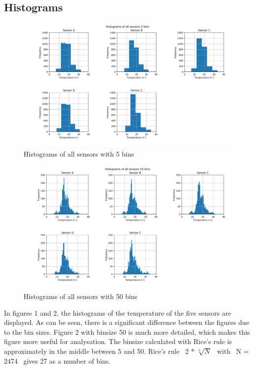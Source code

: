 \documentclass{article}
\begin{document}
    \subsection{Histograms}
        \begin{figure}[H]
            \includegraphics[width=\textwidth]{histogram_5_bins}
            \caption{Histograms of all sensors with 5 bins}
        \end{figure}

        \begin{figure}[H]
            \includegraphics[width=\textwidth]{histogram_50_bins}
            \caption{Histograms of all sensors with 50 bins}
        \end{figure}
        
        In figures 1 and 2, the histograms of the temperature of the five sensors are displayed.
        As can be seen, there is a significant difference between the figures due to the bin sizes.
        Figure 2 with binsize 50 is much more detailed, which makes this figure more useful for analysation.
        The binsize calculated with Rice's rule is approximately in the middle between 5 and 50. 
        Rice's rule \ 2 * $\sqrt[3]{N}$ \ with \ N = 2474 \ gives 27 as a number of bins. 
\end{document}
